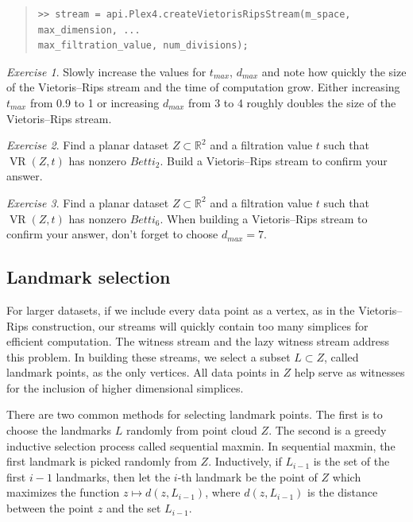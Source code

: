 \documentclass[amscd, amssymb, verbatim]{amsart}[12pt]
\theoremstyle{remark}
\newtheorem{exercise}{Exercise}
\theoremstyle{remark}
\theoremstyle{remark}
\DeclareMathOperator{\VR}{VR}
\begin{document}
\begin{quote} \begin{verbatim}
>> stream = api.Plex4.createVietorisRipsStream(m_space, max_dimension, ...
max_filtration_value, num_divisions);  
\end{verbatim} \end{quote}

\begin{exercise}
Slowly increase the values for $t_{max}$, $d_{max}$ and note how quickly the size of the Vietoris--Rips stream and the time of computation grow. Either increasing $t_{max}$ from 0.9 to 1 or increasing $d_{max}$ from 3 to 4 roughly doubles the size of the Vietoris--Rips stream. 
\end{exercise}

\begin{exercise}
Find a planar dataset $Z \subset \mathbb{R}^2$ and a filtration value $t$ such that $\VR(Z,t)$ has nonzero $Betti_2$. Build a Vietoris--Rips stream to confirm your answer. 
\end{exercise}

\begin{exercise}
Find a planar dataset $Z \subset \mathbb{R}^2$ and a filtration value $t$ such that $\VR(Z,t)$ has nonzero $Betti_6$. When building a Vietoris--Rips stream to confirm your answer, don't forget to choose $d_{max} = 7$. 
\end{exercise}


\subsection{Landmark selection}\label{lands}
For larger datasets, if we include every data point as a vertex, as in the Vietoris--Rips construction, our streams will quickly contain too many simplices for efficient computation. The witness stream and the lazy witness stream address this problem. In building these streams, we select a subset $L \subset Z$, called landmark points, as the only vertices. All data points in $Z$ help serve as witnesses for the inclusion of higher dimensional simplices. 

There are two common methods for selecting landmark points. The first is to choose the landmarks $L$ randomly from point cloud $Z$. The second is a greedy inductive selection process called sequential maxmin. In sequential maxmin, the first landmark is picked randomly from $Z$. Inductively, if $L_{i-1}$ is the set of the first $i-1$ landmarks, then let the $i$-th landmark be the point of $Z$ which maximizes the function $z \mapsto d(z, L_{i-1})$, where $d(z, L_{i-1})$ is the distance between the point $z$ and the set $L_{i-1}$. 
\end{document}
